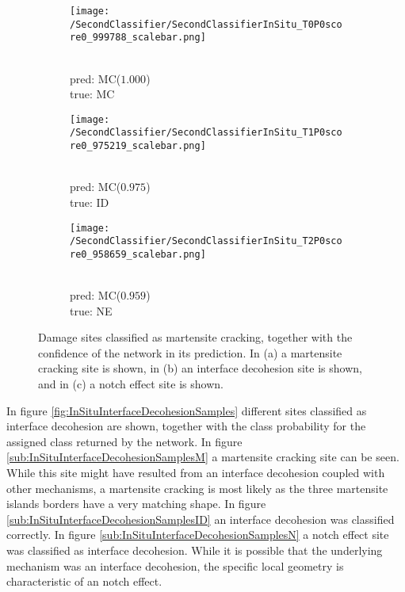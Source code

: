 \begin{figure}[H]
\centering
\begin{subfigure}{0.3\textwidth}
\texttt{[image: /SecondClassifier/SecondClassifierInSitu\_T0P0score0\_999788\_scalebar.png]}
\caption{\\pred: MC($1.000$) \\ true: MC}
\label{sub:InSituMartensiteSamplesM}
\end{subfigure}
\begin{subfigure}{0.3\textwidth}
\texttt{[image: /SecondClassifier/SecondClassifierInSitu\_T1P0score0\_975219\_scalebar.png]}
\caption{\\pred: MC($0.975$) \\ true: ID}
\label{sub:InSituMartensiteSamplesI}
\end{subfigure}
\begin{subfigure}{0.3\textwidth}
\texttt{[image: /SecondClassifier/SecondClassifierInSitu\_T2P0score0\_958659\_scalebar.png]}
\caption{\\pred: MC($0.959$) \\ true: NE}
\label{sub:InSituMartensiteSamplesN}
\end{subfigure}
\caption{Damage sites classified as martensite cracking, together with the confidence of the network in its prediction. In (a) a martensite cracking site is shown, in (b) an interface decohesion site is shown, and in (c) a notch effect site is shown. }
\label{fig:InSituMartensiteSamples}
\end{figure}

In figure \ref{fig:InSituInterfaceDecohesionSamples} different sites classified as interface decohesion are shown, together with the class probability for the assigned class returned by the network. In figure \ref{sub:InSituInterfaceDecohesionSamplesM} a martensite cracking site can be seen. While this site might have resulted from an interface decohesion coupled with other mechanisms, a martensite cracking is most likely as the three martensite islands borders have a very matching shape. In figure \ref{sub:InSituInterfaceDecohesionSamplesID} an interface decohesion was classified correctly. In figure \ref{sub:InSituInterfaceDecohesionSamplesN} a notch effect site was classified as interface decohesion. While it is possible that the underlying mechanism was an interface decohesion, the specific local geometry is characteristic of an notch effect.

